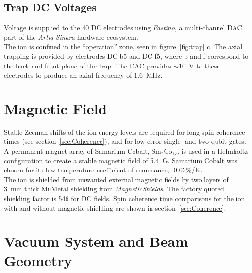 \subsection{Trap DC Voltages}
    Voltage is supplied to the 40 DC electrodes using \emph{Fastino}, a
    multi-channel DAC part of the \emph{Artiq Sinara} hardware
    ecosystem.\\
    The ion is confined in the ``operation'' zone, seen in
    figure~\ref{fig:trap} c. The axial trapping is provided by electrodes
    DC-b5 and DC-f5, where b and f correspond to the back and front plane of the trap. 
    The DAC provides $\sim 10$~V to these electrodes to produce an axial frequency of 1.6~MHz.
    
\section{Magnetic Field}
\label{sec:Magnetic Field}
    Stable Zeeman shifts of the ion energy levels are required for long spin
    coherence times (see section~\ref{sec:Coherence}), and for low error single-
    and two-qubit gates. A permanent magnet array of Samarium Cobalt,
    Sm$_2$Co$_17$, is used in a Helmholtz configuration to create a stable magnetic
    field of 5.4~G. Samarium Cobalt was chosen for its low temperature
    coefficient of remenance, -0.03\%/K.\\
    The ion is shielded from unwanted external magnetic fields by two layers of
    3~mm thick MuMetal shielding from \emph{MagneticShields}. The factory quoted
    shielding factor is 546 for DC fields. Spin coherence time comparisons for
    the ion with and without magnetic shielding are shown in
    section~\ref{sec:Coherence}.\\

\section{Vacuum System and Beam Geometry}
\label{sec:Vacuum System}



